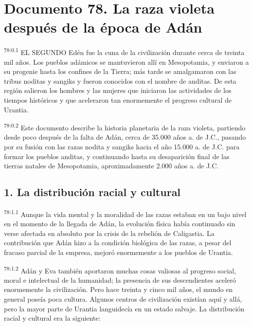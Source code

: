 \chapter{Documento 78. La raza violeta después de la época de Adán}
\par
\textsuperscript{78:0.1} EL SEGUNDO Edén fue la cuna de la civilización durante cerca de treinta mil años. Los pueblos adámicos se mantuvieron allí en Mesopotamia, y enviaron a su progenie hasta los confines de la Tierra; más tarde se amalgamaron con las tribus noditas y sangiks y fueron conocidos con el nombre de anditas. De esta región salieron los hombres y las mujeres que iniciaron las actividades de los tiempos históricos y que aceleraron tan enormemente el progreso cultural de Urantia.

\par
\textsuperscript{78:0.2} Este documento describe la historia planetaria de la raza violeta, partiendo desde poco después de la falta de Adán, cerca de 35.000 años a. de J.C., pasando por su fusión con las razas nodita y sangiks hacia el año 15.000 a. de J.C. para formar los pueblos anditas, y continuando hasta su desaparición final de las tierras natales de Mesopotamia, aproximadamente 2.000 años a. de J.C.

\section*{1. La distribución racial y cultural}
\par
\textsuperscript{78:1.1} Aunque la vida mental y la moralidad de las razas estaban en un bajo nivel en el momento de la llegada de Adán, la evolución física había continuado sin verse afectada en absoluto por la crisis de la rebelión de Caligastia. La contribución que Adán hizo a la condición biológica de las razas, a pesar del fracaso parcial de la empresa, mejoró enormemente a los pueblos de Urantia.

\par
\textsuperscript{78:1.2} Adán y Eva también aportaron muchas cosas valiosas al progreso social, moral e intelectual de la humanidad; la presencia de sus descendientes aceleró enormemente la civilización. Pero hace treinta y cinco mil años, el mundo en general poseía poca cultura. Algunos centros de civilización existían aquí y allá, pero la mayor parte de Urantia languidecía en un estado salvaje. La distribución racial y cultural era la siguiente:


